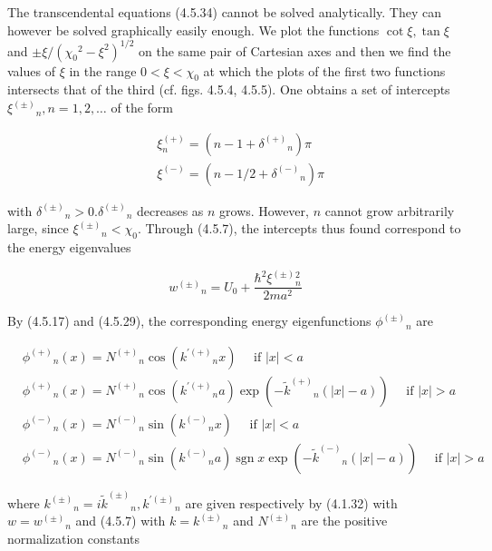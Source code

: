\documentclass{article}
\begin{document}
The transcendental equations (4.5.34) cannot be solved analytically. They can however be solved graphically easily enough. We plot the functions $\cot \xi, \tan \xi$ and $\pm \xi /\left(\chi_{0}{ }^{2}-\xi^{2}\right)^{1 / 2}$ on the same pair of Cartesian axes and then we find the values of $\xi$ in the range $0<\xi<\chi_{0}$ at which the plots of the first two functions intersects that of the third (cf. figs. 4.5.4, 4.5.5). One obtains a set of intercepts $\xi^{( \pm)}{ }_{n}, n=1,2, \ldots$ of the form
 
\begin{align*}
& \xi_{n}^{(+)}=\left(n-1+\delta^{(+)}{ }_{n}\right) \pi  \tag{4.5.36a}\\
& \xi^{(-)}=\left(n-1 / 2+\delta^{(-)}{ }_{n}\right) \pi \tag{4.5.36b}
\end{align*}
 
with $\delta^{( \pm)}{ }_{n}>0 . \delta^{( \pm)}{ }_{n}$ decreases as $n$ grows. However, $n$ cannot grow arbitrarily large, since $\xi^{( \pm)}{ }_{n}<\chi_{0}$. Through (4.5.7), the intercepts thus found correspond to the energy eigenvalues
 
\begin{equation*}
w^{( \pm)}{ }_{n}=U_{0}+\frac{\hbar^{2} \xi^{( \pm)}{ }_{n}^{2}}{2 m a^{2}} \tag{4.5.37}
\end{equation*}
 

By (4.5.17) and (4.5.29), the corresponding energy eigenfunctions $\phi^{( \pm)}{ }_{n}$ are
 
\begin{align*}
& \phi^{(+)}{ }_{n}(x)=N^{(+)}{ }_{n} \cos \left({k^{\prime(+)}}_{n} x\right) \quad \text { if }|x|<a  \tag{4.5.38a}\\
& \phi^{(+)}{ }_{n}(x)=N^{(+)}{ }_{n} \cos \left(k^{\prime(+)}{ }_{n} a\right) \exp \left(-\tilde{k}^{(+)}{ }_{n}(|x|-a)\right) \quad \text { if }|x|>a  \tag{4.5.38b}\\
& \phi^{(-)}{ }_{n}(x)=N^{(-)}{ }_{n} \sin \left(k^{(-)}{ }_{n} x\right) \quad \text { if }|x|<a  \tag{4.5.38c}\\
& \phi^{(-)}{ }_{n}(x)=N^{(-)}{ }_{n} \sin \left({k^{(-)}}_{n} a\right) \operatorname{sgn} x \exp \left(-\tilde{k}^{(-)}{ }_{n}(|x|-a)\right) \quad \text { if }|x|>a \tag{4.5.38d}
\end{align*}
 
where $k^{( \pm)}{ }_{n}=i \tilde{k}^{( \pm)}{ }_{n}, k^{\prime( \pm)}{ }_{n}$ are given respectively by (4.1.32) with $w=w^{( \pm)}{ }_{n}$ and (4.5.7) with $k=k^{( \pm)}{ }_{n}$ and $N^{( \pm)}{ }_{n}$ are the positive normalization constants
 
\end{document}
